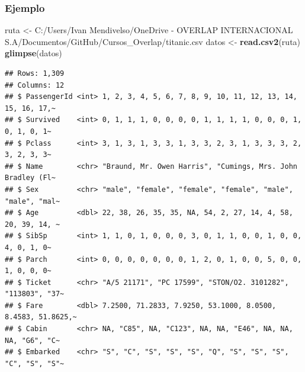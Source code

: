 \documentclass[
]{article}
\newenvironment{Shaded}{\begin{snugshade}}{\end{snugshade}}
\newcommand{\FunctionTok}[1]{\textcolor[rgb]{0.13,0.29,0.53}{\textbf{#1}}}
\newcommand{\NormalTok}[1]{#1}
\newcommand{\OtherTok}[1]{\textcolor[rgb]{0.56,0.35,0.01}{#1}}
\newcommand{\SpecialCharTok}[1]{\textcolor[rgb]{0.81,0.36,0.00}{\textbf{#1}}}
\newcommand{\StringTok}[1]{\textcolor[rgb]{0.31,0.60,0.02}{#1}}
\begin{document}
\hypertarget{ejemplo}{%
\subsubsection{Ejemplo}\label{ejemplo}}

\begin{Shaded}
\begin{Highlighting}[]
\NormalTok{ruta }\OtherTok{\textless{}{-}} \StringTok{\textquotesingle{}C:/Users/Ivan Mendivelso/OneDrive {-} OVERLAP INTERNACIONAL S.A/Documentos/GitHub/Cursos\_Overlap/titanic.csv\textquotesingle{}}
\NormalTok{datos }\OtherTok{\textless{}{-}} \FunctionTok{read.csv2}\NormalTok{(ruta)}
\FunctionTok{glimpse}\NormalTok{(datos)}
\end{Highlighting}
\end{Shaded}

\begin{verbatim}
## Rows: 1,309
## Columns: 12
## $ PassengerId <int> 1, 2, 3, 4, 5, 6, 7, 8, 9, 10, 11, 12, 13, 14, 15, 16, 17,~
## $ Survived    <int> 0, 1, 1, 1, 0, 0, 0, 0, 1, 1, 1, 1, 0, 0, 0, 1, 0, 1, 0, 1~
## $ Pclass      <int> 3, 1, 3, 1, 3, 3, 1, 3, 3, 2, 3, 1, 3, 3, 3, 2, 3, 2, 3, 3~
## $ Name        <chr> "Braund, Mr. Owen Harris", "Cumings, Mrs. John Bradley (Fl~
## $ Sex         <chr> "male", "female", "female", "female", "male", "male", "mal~
## $ Age         <dbl> 22, 38, 26, 35, 35, NA, 54, 2, 27, 14, 4, 58, 20, 39, 14, ~
## $ SibSp       <int> 1, 1, 0, 1, 0, 0, 0, 3, 0, 1, 1, 0, 0, 1, 0, 0, 4, 0, 1, 0~
## $ Parch       <int> 0, 0, 0, 0, 0, 0, 0, 1, 2, 0, 1, 0, 0, 5, 0, 0, 1, 0, 0, 0~
## $ Ticket      <chr> "A/5 21171", "PC 17599", "STON/O2. 3101282", "113803", "37~
## $ Fare        <dbl> 7.2500, 71.2833, 7.9250, 53.1000, 8.0500, 8.4583, 51.8625,~
## $ Cabin       <chr> NA, "C85", NA, "C123", NA, NA, "E46", NA, NA, NA, "G6", "C~
## $ Embarked    <chr> "S", "C", "S", "S", "S", "Q", "S", "S", "S", "C", "S", "S"~
\end{verbatim}

\begin{Shaded}
\end{Shaded}
\end{document}
